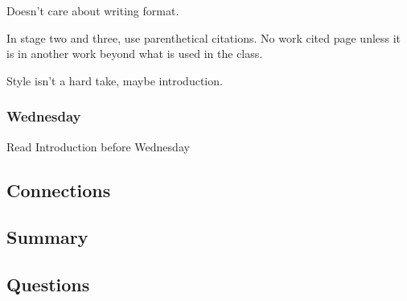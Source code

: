 Doesn't care about writing format.

In stage two and three, use parenthetical citations. No work cited page unless it is in another work beyond what is used in the class.

Style isn't a hard take, maybe introduction.


\subsubsection{Wednesday}

Read Introduction before Wednesday

\subsection{Connections}


\subsection{Summary}


\subsection{Questions}
